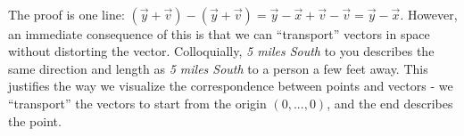  \ \\
The proof is one line: $(\vec{y}+\vec{v}) - (\vec{y}+\vec{v}) = \vec{y}-\vec{x} +\vec{v}-\vec{v}=\vec{y}-\vec{x}$. However, an immediate consequence of this is that we can ``transport'' vectors in space without distorting the vector. Colloquially, \textit{5 miles South} to you describes the same direction and length as \textit{5 miles South} to a person a few feet away. This justifies the way we visualize the correspondence between points and vectors - we ``transport'' the vectors to start from the origin $(0,...,0)$, and the end describes the point.

